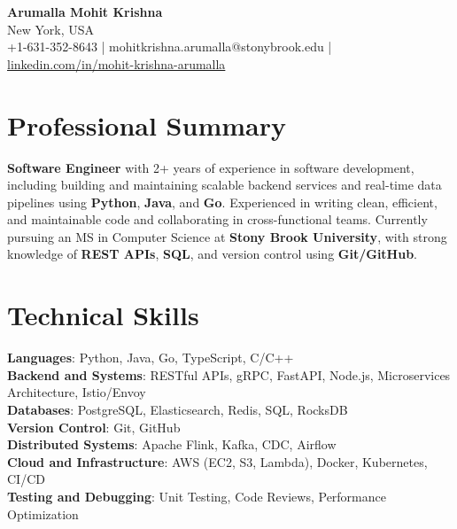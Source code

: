 \documentclass[letterpaper,11pt]{article}
\begin{document}
\begin{center}
  {\Large \textbf{Arumalla Mohit Krishna}} \\
  New York, USA \\
  +1-631-352-8643 \enspace | \enspace mohitkrishna.arumalla@stonybrook.edu \enspace | \enspace \href{https://www.linkedin.com/in/mohit-krishna-arumalla}{linkedin.com/in/mohit-krishna-arumalla}
\end{center}

\section{Professional Summary}
  \begin{itemize}[leftmargin=0.15in, label={}]
    \small{\item{
     \textbf{Software Engineer} with 2+ years of experience in software development, including building and maintaining scalable backend services and real-time data pipelines using \textbf{Python}, \textbf{Java}, and \textbf{Go}. Experienced in writing clean, efficient, and maintainable code and collaborating in cross-functional teams. Currently pursuing an MS in Computer Science at \textbf{Stony Brook University}, with strong knowledge of \textbf{REST APIs}, \textbf{SQL}, and version control using \textbf{Git/GitHub}.
    }}
  \end{itemize}
\vspace{-16pt}

\section{Technical Skills}
 \begin{itemize}[leftmargin=0.15in, label={}]
    \small{\item{
     \textbf{Languages}: Python, Java, Go, TypeScript, C/C++ \\
     \textbf{Backend and Systems}: RESTful APIs, gRPC, FastAPI, Node.js, Microservices Architecture, Istio/Envoy \\
     \textbf{Databases}: PostgreSQL, Elasticsearch, Redis, SQL, RocksDB \\
     \textbf{Version Control}: Git, GitHub \\
     \textbf{Distributed Systems}: Apache Flink, Kafka, CDC, Airflow \\
     \textbf{Cloud and Infrastructure}: AWS (EC2, S3, Lambda), Docker, Kubernetes, CI/CD \\
     \textbf{Testing and Debugging}: Unit Testing, Code Reviews, Performance Optimization
    }}
 \end{itemize}
\vspace{-16pt}
\end{document}
